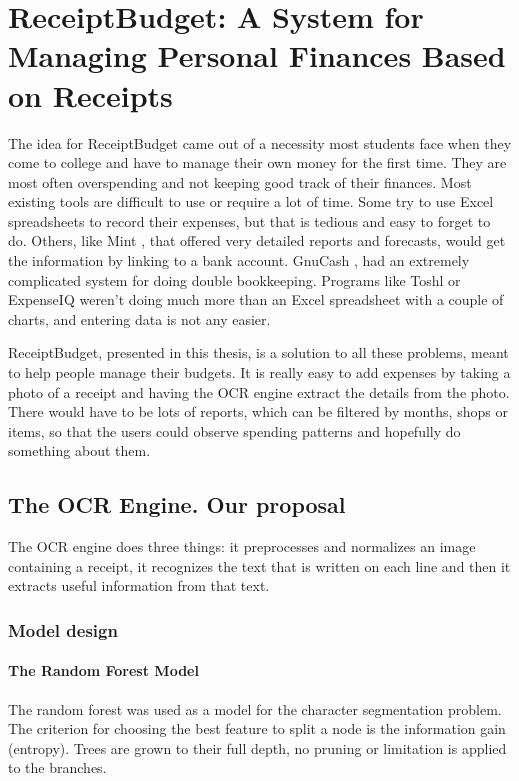 \chapter{ReceiptBudget: A System for Managing Personal Finances Based on Receipts}
\label{chap:application}

The idea for ReceiptBudget came out of a necessity most students face when they come to college and have to manage their own money for the first time. They are most often overspending and not keeping good track of their finances. Most existing tools are difficult to use or require a lot of time. Some try to use Excel spreadsheets to record their expenses, but that is tedious and easy to forget to do. Others, like Mint \cite{mint}, that offered very detailed reports and forecasts, would get the information by linking to a bank account. GnuCash \cite{gnucash}, had an extremely complicated system for doing double bookkeeping. Programs like Toshl \cite{toshl} or ExpenseIQ \cite{expenseiq} weren't doing much more than an Excel spreadsheet with a couple of charts, and entering data is not any easier. 

ReceiptBudget, presented in this thesis, is a solution to all these problems, meant to help people manage their budgets. It is  really easy to add expenses by taking a photo of a receipt and having the OCR engine extract the details from the photo. There would have to be lots of reports, which can be filtered by months, shops or items, so that the users could observe spending patterns and hopefully do something about them.

\section{The OCR Engine. Our proposal}
The OCR engine does three things: it preprocesses and normalizes an image containing a receipt, it recognizes the text that is written on each line and then it extracts useful information from that text. 

\subsection{Model design}

\subsubsection{The Random Forest Model}
The random forest was used as a model for the character segmentation problem. The criterion for choosing the best feature to split a node is the information gain (entropy). Trees are grown to their full depth, no pruning or limitation is applied to the branches. 

